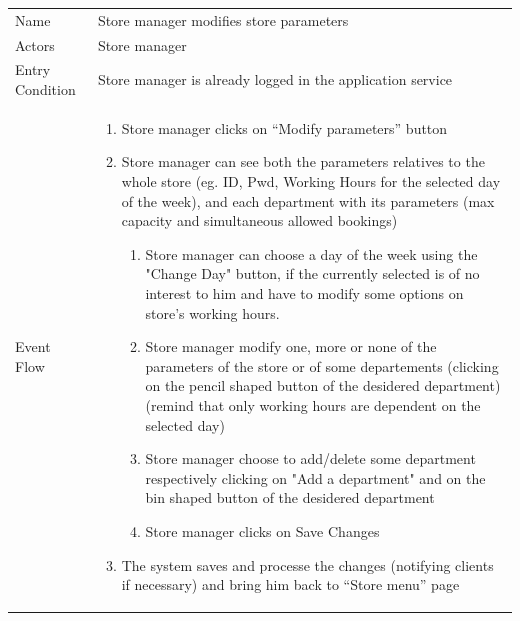 \documentclass{article}
\newcommand\xrowht[2][0]
{\addstackgap[.5\dimexpr#2\relax]{\vphantom{#1}}}
\begin{document}
				\begin{center}
					
					
					\begin{adjustwidth}{-3cm}{}
					\begin{tabular}[h!]{|m{7.5em}|m{36em}|}
						
						\hline
						\xrowht{5pt}
						Name & Store manager modifies store parameters\\
						\xrowht{5pt}
						Actors & Store manager\\
						\xrowht{5pt}
						Entry Condition & Store manager is already logged in the application service\\
						\xrowht{5pt}
						Event Flow & \begin{enumerate}
							
							\itemsep-0.25em
							\item Store manager clicks on “Modify parameters” button
							\item Store manager can see both the parameters relatives to the whole store (eg. ID, Pwd, Working Hours for the selected day of the week), and each department with its parameters (max capacity and simultaneous allowed bookings)
							
							\begin{enumerate}
								
								\itemsep0em
								\item Store manager can choose a day of the week using the "Change Day" button, if the currently selected is of no interest to him and have to modify some options on store's working hours.
								\item Store manager modify one, more or none of the parameters of the store or of some departements (clicking on the pencil shaped button of the desidered department) (remind that only working hours are dependent on the selected day)
								\item Store manager choose to add/delete some department respectively clicking on "Add a department" and on the bin shaped button of the desidered department
								\item Store manager clicks on Save Changes
					
								
							\end{enumerate}
							\item The system saves and processe the changes (notifying clients if necessary) and bring him back to “Store menu” page
							

\end{enumerate}
\end{tabular}
\end{adjustwidth}
\end{center}
\end{document}
